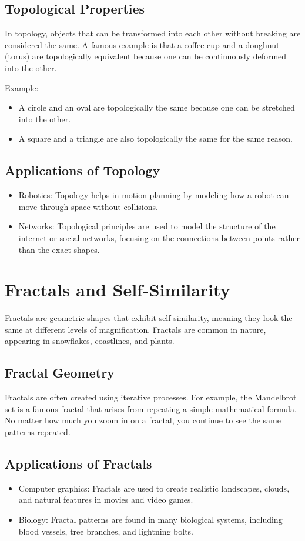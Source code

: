 \subsection{Topological Properties}
In topology, objects that can be transformed into each other without breaking are considered the same. A famous example is that a coffee cup and a doughnut (torus) are topologically equivalent because one can be continuously deformed into the other.

Example:
\begin{itemize}
    \item A circle and an oval are topologically the same because one can be stretched into the other.
    \item A square and a triangle are also topologically the same for the same reason.
\end{itemize}

\subsection{Applications of Topology}
\begin{itemize}
    \item Robotics: Topology helps in motion planning by modeling how a robot can move through space without collisions.
    \item Networks: Topological principles are used to model the structure of the internet or social networks, focusing on the connections between points rather than the exact shapes.
\end{itemize}

\section{Fractals and Self-Similarity}
Fractals are geometric shapes that exhibit self-similarity, meaning they look the same at different levels of magnification. Fractals are common in nature, appearing in snowflakes, coastlines, and plants.

\subsection{Fractal Geometry}
Fractals are often created using iterative processes. For example, the Mandelbrot set is a famous fractal that arises from repeating a simple mathematical formula. No matter how much you zoom in on a fractal, you continue to see the same patterns repeated.

\subsection{Applications of Fractals}
\begin{itemize}
    \item Computer graphics: Fractals are used to create realistic landscapes, clouds, and natural features in movies and video games.
    \item Biology: Fractal patterns are found in many biological systems, including blood vessels, tree branches, and lightning bolts.
\end{itemize}

